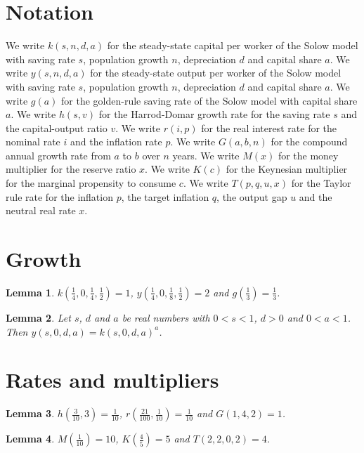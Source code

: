 \documentclass{article}
\newtheorem{lemma}{Lemma}
\begin{document}
\section{Notation}

We write $k(s,n,d,a)$ for the steady-state capital per worker of the Solow model with saving rate $s$, population growth $n$, depreciation $d$ and capital share $a$.
We write $y(s,n,d,a)$ for the steady-state output per worker of the Solow model with saving rate $s$, population growth $n$, depreciation $d$ and capital share $a$.
We write $g(a)$ for the golden-rule saving rate of the Solow model with capital share $a$.
We write $h(s,v)$ for the Harrod-Domar growth rate for the saving rate $s$ and the capital-output ratio $v$.
We write $r(i,p)$ for the real interest rate for the nominal rate $i$ and the inflation rate $p$.
We write $G(a,b,n)$ for the compound annual growth rate from $a$ to $b$ over $n$ years.
We write $M(x)$ for the money multiplier for the reserve ratio $x$.
We write $K(c)$ for the Keynesian multiplier for the marginal propensity to consume $c$.
We write $T(p,q,u,x)$ for the Taylor rule rate for the inflation $p$, the target inflation $q$, the output gap $u$ and the neutral real rate $x$.

\section{Growth}

\begin{lemma}\label{solow}
$k(\frac14,0,\frac14,\frac12)=1$, $y(\frac14,0,\frac18,\frac12)=2$ and $g(\frac13)=\frac13$.
\end{lemma}

\begin{lemma}\label{output}
Let $s$, $d$ and $a$ be real numbers with $0<s<1$, $d>0$ and $0<a<1$. Then $y(s,0,d,a)=k(s,0,d,a)^a$.
\end{lemma}

\section{Rates and multipliers}

\begin{lemma}\label{rates}
$h(\frac{3}{10},3)=\frac{1}{10}$, $r(\frac{21}{100},\frac{1}{10})=\frac{1}{10}$ and $G(1,4,2)=1$.
\end{lemma}

\begin{lemma}\label{multipliers}
$M(\frac{1}{10})=10$, $K(\frac45)=5$ and $T(2,2,0,2)=4$.
\end{lemma}
\end{document}
